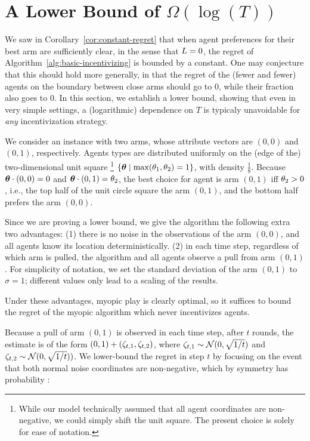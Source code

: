 \section{A Lower Bound of $\Omega(\log(T))$} \label{sec:lb}

We saw in Corollary~\ref{cor:constant-regret} that 
when agent preferences for their best arm are sufficiently clear,
in the sense that $L = 0$, the regret of
Algorithm~\ref{alg:basic-incentivizing} is bounded by a constant.
One may conjecture that this should hold more generally,
in that the regret of the (fewer and fewer) agents on the boundary
between close arms should go to 0, while their fraction also goes to 0.
In this section, we establish a lower bound,
showing that even in very simple settings, a (logarithmic) dependence
on $T$ is typicaly unavoidable for \emph{any} incentivization strategy.

We consider an instance with two arms,
whose attribute vectors are $(0,0)$ and $(0,1)$, respectively.
Agents types are distributed uniformly on the (edge of the)
two-dimensional unit square%
\footnote{While our model technically assumed that all agent coordinates are
non-negative, we could simply shift the unit square.
The present choice is solely for ease of notation.}  
$\{ \bm{\theta} \mid \max(\theta_{1}, \theta_{2}) = 1 \}$,
with density $\frac{1}{8}$.
Because $\bm{\theta} \cdot (0,0) = 0$ and $\bm{\theta} \cdot (0,1) = \theta_{2}$,
the best choice for agent \AgV is arm $(0,1)$ iff $\theta_{2} > 0$,
i.e., the top half of the unit circle square the arm $(0,1)$,
and the bottom half prefers the arm $(0,0)$.

Since we are proving a lower bound, we give the algorithm the
following extra two advantages:
(1) there is no noise in the observations of the arm $(0,0)$,
and all agents know its location deterministically.
(2) in each time step, regardless of which arm is pulled, the algorithm
and all agents observe a pull from arm $(0,1)$.
For simplicity of notation, we set the standard deviation of the arm
$(0,1)$ to $\sigma = 1$;
different values only lead to a scaling of the results.

Under these advantages, myopic play is clearly optimal, so it suffices
to bound the regret of the myopic algorithm which never incentivizes
agents. 

Because a pull of arm $(0,1)$ is observed in each time step,
after $t$ rounds, the estimate  is of the form
$(0,1) + (\Noise[t]{1}, \Noise[t]{2})$,
where $\Noise[t]{1} \sim \Normal{0}{\sqrt{1/t}}$
and $\Noise[t]{2} \sim \Normal{0}{\sqrt{1/t}})$.
We lower-bound the regret in step $t$ by focusing on the event that
both normal noise coordinates are non-negative,
which by symmetry has probability \quarter:

